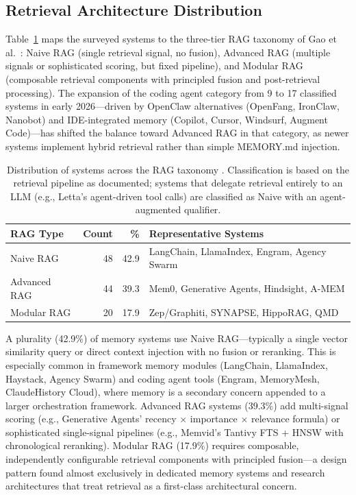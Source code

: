 \subsection{Retrieval Architecture Distribution}
\label{sec:rag-distribution}

Table~\ref{tab:rag-distribution} maps the surveyed systems to the three-tier
RAG taxonomy of Gao et al.~\cite{gao2023rag}: Naive RAG (single retrieval
signal, no fusion), Advanced RAG (multiple signals or sophisticated
scoring, but fixed pipeline), and Modular RAG (composable retrieval
components with principled fusion and post-retrieval processing).  The
expansion of the coding agent category from 9 to 17 classified systems
in early 2026---driven by OpenClaw alternatives (OpenFang, IronClaw,
Nanobot) and IDE-integrated memory (Copilot, Cursor, Windsurf,
Augment Code)---has
shifted the balance toward Advanced RAG in that category, as newer
systems implement hybrid retrieval rather than simple MEMORY.md
injection.

\begin{table}[!t]
\centering
\caption{Distribution of systems across the RAG taxonomy \cite{gao2023rag}. Classification is based on the retrieval pipeline as documented; systems that delegate retrieval entirely to an LLM (e.g., Letta's agent-driven tool calls) are classified as Naive with an agent-augmented qualifier.}
\label{tab:rag-distribution}
\small
\begin{tabular}{@{}lrrp{4.0cm}@{}}
\toprule
\textbf{RAG Type} & \textbf{Count} & \textbf{\%} & \textbf{Representative Systems} \\
\midrule
Naive RAG       & 48 & 42.9 & LangChain, LlamaIndex, Engram, Agency Swarm \\
Advanced RAG    & 44 & 39.3 & Mem0, Generative Agents, Hindsight, A-MEM \\
Modular RAG     & 20 & 17.9 & Zep/Graphiti, SYNAPSE, HippoRAG, QMD \\
\bottomrule
\end{tabular}
\end{table}

A plurality (42.9\%) of memory systems use Naive RAG---typically a single
vector similarity query or direct context injection with no fusion or
reranking. This is especially common in framework memory modules (LangChain,
LlamaIndex, Haystack, Agency Swarm) and coding agent tools (Engram,
MemoryMesh, ClaudeHistory Cloud), where memory is a secondary concern appended
to a larger orchestration framework. Advanced RAG systems (39.3\%) add
multi-signal scoring (e.g., Generative Agents' recency $\times$ importance
$\times$ relevance formula) or sophisticated single-signal pipelines (e.g.,
Memvid's Tantivy FTS + HNSW with chronological reranking). Modular RAG
(17.9\%) requires composable, independently configurable retrieval components
with principled fusion---a design pattern found almost exclusively in dedicated
memory systems and research architectures that treat retrieval as a first-class
architectural concern.

